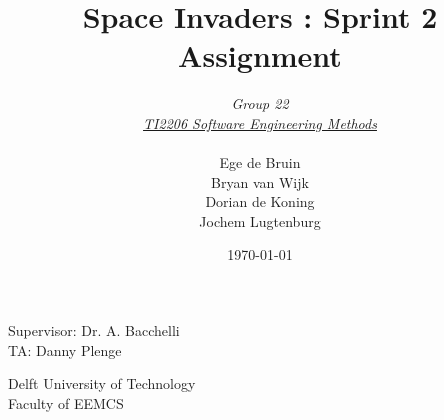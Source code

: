 \documentclass[10pt]{article}
\begin{document}
\title{Space Invaders : Sprint 2 Assignment}
\date{\today}
\author{\textit{Group 22}\\ \textit{\underline{TI2206 Software Engineering Methods}} \\
 \\Ege de Bruin \\ Bryan van Wijk \\ Dorian de Koning \\ Jochem Lugtenburg }
 \maketitle  
 \begin{center}
Supervisor: Dr. A. Bacchelli\\
TA: Danny Plenge\\
 \end{center}     
 \begin{center}
 Delft University of Technology\\
 Faculty of EEMCS\\
 \end{center}
 \thispagestyle{empty}
 \pagebreak
 

\newpage

\end{document}
